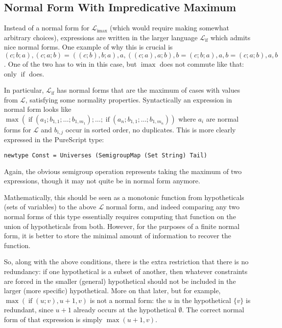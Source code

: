 \documentclass[11pt, twoside, reqno]{book}
\DeclareMathOperator{\imax}{imax}
\DeclareMathOperator{\ifop}{if}
\begin{document}
\subsection{Normal Form With Impredicative Maximum}

Instead of a normal form for \(\mathcal{L}_{\imax}\) (which would require making somewhat arbitrary choices), expressions are written in the larger language \(\mathcal{L}_{\ifop}\) which admits nice normal forms.
One example of why this is crucial is \((c; b; a), (c; a; b) = ((c; b), b; a), a, ((c; a), a; b), b = (c; b; a), a, b = (c; a; b), a, b\).
One of the two has to win in this case, but \(\imax\) does not commute like that: only \(\ifop\) does.

In particular, \(\mathcal{L}_{\ifop}\) has normal forms that are the maximum of cases with values from \(\mathcal{L}\), satisfying some normality properties.
Syntactically an expression in normal form looks like\\ \(\max(\ifop(a_1; b_{1,1}; \dots; b_{1,m_1}); \dots; \ifop(a_n; b_{1,1}; \dots; b_{1,m_n}))\) where \(a_i\) are normal forms for \(\mathcal{L}\) and \(b_{i,j}\) occur in sorted order, no duplicates.
This is more clearly expressed in the PureScript type:
\begin{verbatim}
newtype Const = Universes (SemigroupMap (Set String) Tail)
\end{verbatim}
Again, the obvious semigroup operation represents taking the maximum of two expressions, though it may not quite be in normal form anymore.

Mathematically, this should be seen as a monotonic function from hypotheticals (sets of variables) to the above \(\mathcal{L}\) normal form, and indeed comparing any two normal forms of this type essentially requires computing that function on the union of hypotheticals from both.
However, for the purposes of a finite normal form, it is better to store the minimal amount of information to recover the function.

So, along with the above conditions, there is the extra restriction that there is no redundancy: if one hypothetical is a subset of another, then whatever constraints are forced in the smaller (general) hypothetical should not be included in the larger (more specific) hypothetical.
More on that later, but for example, \(\max(\ifop(u; v), u + 1, v)\) is not a normal form: the \(u\) in the hypothetical \(\{v\}\) is redundant, since \(u + 1\) already occurs at the hypothetical \(\emptyset\).
The correct normal form of that expression is simply \(\max(u+1, v)\).
\end{document}
